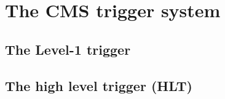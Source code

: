 \section{The CMS trigger system}
\label{sec:Trigger}

\subsection{The Level-1 trigger}


\subsection{The high level trigger (HLT)}
